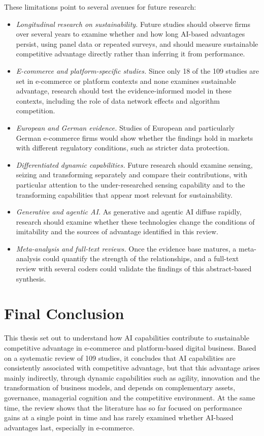These limitations point to several avenues for future research:
\begin{itemize}
  \item \emph{Longitudinal research on sustainability.} Future studies should observe firms over several years to examine whether and how long AI-based advantages persist, using panel data or repeated surveys, and should measure sustainable competitive advantage directly rather than inferring it from performance.
  \item \emph{E-commerce and platform-specific studies.} Since only 18 of the 109 studies are set in e-commerce or platform contexts and none examines sustainable advantage, research should test the evidence-informed model in these contexts, including the role of data network effects and algorithm competition.
  \item \emph{European and German evidence.} Studies of European and particularly German e-commerce firms would show whether the findings hold in markets with different regulatory conditions, such as stricter data protection.
  \item \emph{Differentiated dynamic capabilities.} Future research should examine sensing, seizing and transforming separately and compare their contributions, with particular attention to the under-researched sensing capability and to the transforming capabilities that appear most relevant for sustainability.
  \item \emph{Generative and agentic AI.} As generative and agentic AI diffuse rapidly, research should examine whether these technologies change the conditions of imitability and the sources of advantage identified in this review.
  \item \emph{Meta-analysis and full-text reviews.} Once the evidence base matures, a meta-analysis could quantify the strength of the relationships, and a full-text review with several coders could validate the findings of this abstract-based synthesis.
\end{itemize}

\section{Final Conclusion}
\label{sec:final}

This thesis set out to understand how AI capabilities contribute to sustainable competitive advantage in e-commerce and platform-based digital business. Based on a systematic review of 109 studies, it concludes that AI capabilities are consistently associated with competitive advantage, but that this advantage arises mainly indirectly, through dynamic capabilities such as agility, innovation and the transformation of business models, and depends on complementary assets, governance, managerial cognition and the competitive environment. At the same time, the review shows that the literature has so far focused on performance gains at a single point in time and has rarely examined whether AI-based advantages last, especially in e-commerce.

